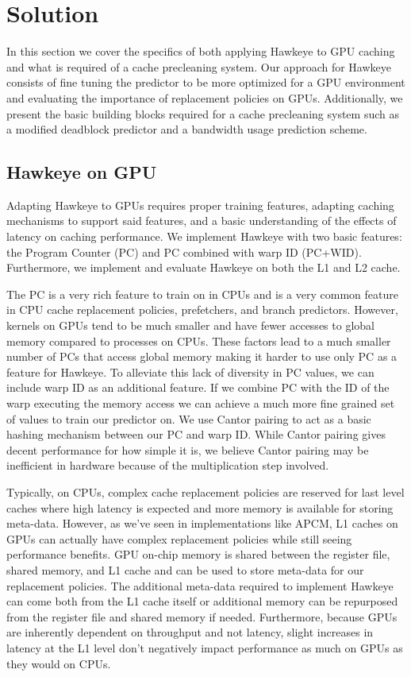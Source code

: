 \chapter{Solution}


In this section we cover the specifics of both applying Hawkeye to GPU caching and what is required of a cache precleaning system. Our approach for Hawkeye consists of fine tuning the predictor to be more optimized for a GPU environment and evaluating the importance of replacement policies on GPUs. Additionally, we present the basic building blocks required for a cache precleaning system such as a modified deadblock predictor and a bandwidth usage prediction scheme.

\section{Hawkeye on GPU}
Adapting Hawkeye to GPUs requires proper training features, adapting caching mechanisms to support said features, and a basic understanding of the effects of latency on caching performance. We implement Hawkeye with two basic features: the Program Counter (PC) and PC combined with warp ID (PC+WID). Furthermore, we implement and evaluate Hawkeye on both the L1 and L2 cache.

The PC is a very rich feature to train on in CPUs and is a very common feature in CPU cache replacement policies, prefetchers, and branch predictors. However, kernels on GPUs tend to be much smaller and have fewer accesses to global memory compared to processes on CPUs. These factors lead to a much smaller number of PCs that access global memory making it harder to use only PC as a feature for Hawkeye. To alleviate this lack of diversity in PC values, we can include warp ID as an additional feature. If we combine PC with the ID of the warp executing the memory access we can achieve a much more fine grained set of values to train our predictor on. We use Cantor pairing to act as a basic hashing mechanism between our PC and warp ID. While Cantor pairing gives decent performance for how simple it is, we believe Cantor pairing may be inefficient in hardware because of the multiplication step involved.

Typically, on CPUs, complex cache replacement policies are reserved for last level caches where high latency is expected and more memory is available for storing meta-data. However, as we’ve seen in implementations like APCM, L1 caches on GPUs can actually have complex replacement policies while still seeing performance benefits. GPU on-chip memory is shared between the register file, shared memory, and L1 cache and can be used to store meta-data for our replacement policies. The additional meta-data required to implement Hawkeye can come both from the L1 cache itself or additional memory can be repurposed from the register file and shared memory if needed. Furthermore, because GPUs are inherently dependent on throughput and not latency, slight increases in latency at the L1 level don’t negatively impact performance as much on GPUs as they would on CPUs.

